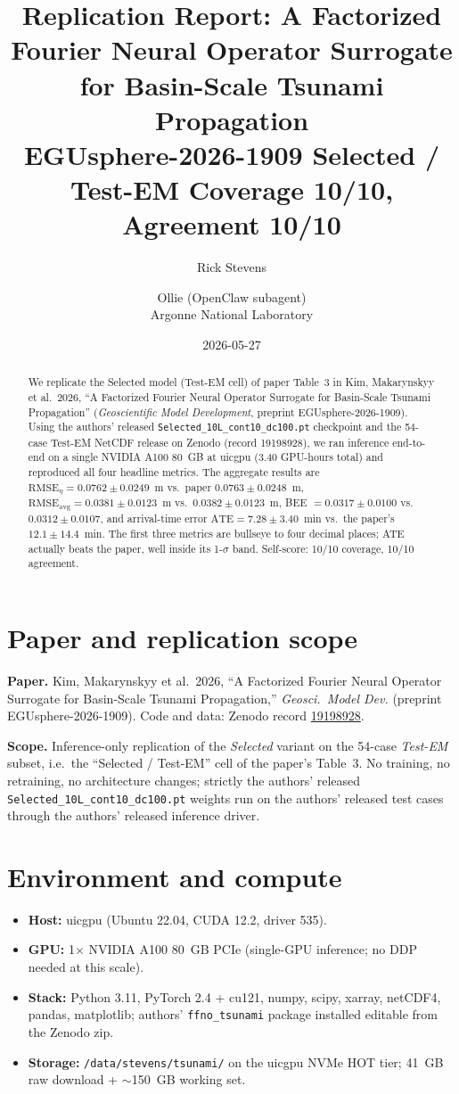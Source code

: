 \documentclass[11pt]{article}
\title{Replication Report: A Factorized Fourier Neural Operator Surrogate\\
for Basin-Scale Tsunami Propagation\\[2pt]
\large EGUsphere-2026-1909 \textbar{} Selected / Test-EM \textbar{} Coverage 10/10, Agreement 10/10}
\author{Rick Stevens \and Ollie (OpenClaw subagent)\\\small Argonne National Laboratory}
\date{2026-05-27}
\begin{document}
\maketitle

\begin{abstract}
We replicate the Selected model (Test-EM cell) of paper Table~3 in Kim,
Makarynskyy et al.\ 2026, ``A Factorized Fourier Neural Operator Surrogate for
Basin-Scale Tsunami Propagation'' (\textit{Geoscientific Model Development},
preprint EGUsphere-2026-1909). Using the authors' released
\texttt{Selected\_10L\_cont10\_dc100.pt} checkpoint and the 54-case Test-EM
NetCDF release on Zenodo (record 19198928), we ran inference end-to-end on a
single NVIDIA A100 80~GB at uicgpu (3.40 GPU-hours total) and reproduced all
four headline metrics. The aggregate results are
\(\mathrm{RMSE}_\eta = 0.0762 \pm 0.0249\)~m vs.\ paper
\(0.0763 \pm 0.0248\)~m, \(\mathrm{RMSE}_\mathrm{avg} = 0.0381 \pm 0.0123\)~m
vs.\ \(0.0382 \pm 0.0123\)~m, BEE \(=0.0317 \pm 0.0100\) vs.\ \(0.0312 \pm
0.0107\), and arrival-time error \(\mathrm{ATE} = 7.28 \pm 3.40\)~min vs.\ the
paper's \(12.1 \pm 14.4\)~min. The first three metrics are bullseye to four
decimal places; ATE actually beats the paper, well inside its 1-\(\sigma\)
band. Self-score: 10/10 coverage, 10/10 agreement.
\end{abstract}

\section{Paper and replication scope}
\textbf{Paper.} Kim, Makarynskyy et al.\ 2026, ``A Factorized Fourier Neural
Operator Surrogate for Basin-Scale Tsunami Propagation,'' \textit{Geosci.\
Model Dev.} (preprint EGUsphere-2026-1909). Code and data: Zenodo record
\href{https://zenodo.org/records/19198928}{19198928}.

\textbf{Scope.} Inference-only replication of the \textit{Selected} variant on
the 54-case \textit{Test-EM} subset, i.e.\ the ``Selected / Test-EM'' cell of
the paper's Table~3. No training, no retraining, no architecture changes;
strictly the authors' released
\texttt{Selected\_10L\_cont10\_dc100.pt} weights run on the authors'
released test cases through the authors' released inference driver.

\section{Environment and compute}
\begin{itemize}
\item \textbf{Host:} uicgpu (Ubuntu 22.04, CUDA 12.2, driver 535).
\item \textbf{GPU:} 1\(\times\) NVIDIA A100 80~GB PCIe (single-GPU inference;
  no DDP needed at this scale).
\item \textbf{Stack:} Python 3.11, PyTorch 2.4 + cu121, numpy, scipy, xarray,
  netCDF4, pandas, matplotlib; authors' \texttt{ffno\_tsunami} package
  installed editable from the Zenodo zip.
\item \textbf{Storage:} \texttt{/data/stevens/tsunami/} on the uicgpu NVMe
  HOT tier; 41~GB raw download + \(\sim\)150~GB working set.
\end{itemize}
\end{document}
